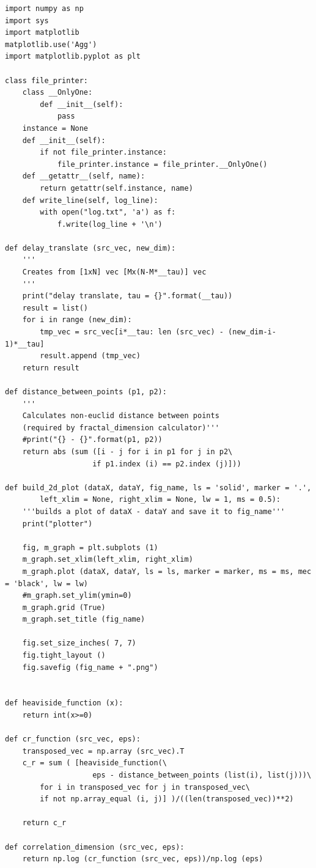 \documentclass[12pt, oneside, a4paper]{article}
\begin{document}
\begin{verbatim}
import numpy as np
import sys
import matplotlib
matplotlib.use('Agg')
import matplotlib.pyplot as plt

class file_printer:
    class __OnlyOne:
        def __init__(self):
            pass
    instance = None
    def __init__(self):
        if not file_printer.instance:
            file_printer.instance = file_printer.__OnlyOne()
    def __getattr__(self, name):
        return getattr(self.instance, name)
    def write_line(self, log_line):
        with open("log.txt", 'a') as f:
            f.write(log_line + '\n')

def delay_translate (src_vec, new_dim):
    '''
    Creates from [1xN] vec [Mx(N-M*__tau)] vec
    '''
    print("delay translate, tau = {}".format(__tau))
    result = list()
    for i in range (new_dim):
        tmp_vec = src_vec[i*__tau: len (src_vec) - (new_dim-i-1)*__tau]
        result.append (tmp_vec)
    return result

def distance_between_points (p1, p2):
    '''
    Calculates non-euclid distance between points
    (required by fractal_dimension calculator)'''
    #print("{} - {}".format(p1, p2))
    return abs (sum ([i - j for i in p1 for j in p2\
                    if p1.index (i) == p2.index (j)]))

def build_2d_plot (dataX, dataY, fig_name, ls = 'solid', marker = '.',
        left_xlim = None, right_xlim = None, lw = 1, ms = 0.5):
    '''builds a plot of dataX - dataY and save it to fig_name'''
    print("plotter")

    fig, m_graph = plt.subplots (1)
    m_graph.set_xlim(left_xlim, right_xlim)
    m_graph.plot (dataX, dataY, ls = ls, marker = marker, ms = ms, mec = 'black', lw = lw)
    #m_graph.set_ylim(ymin=0)
    m_graph.grid (True)
    m_graph.set_title (fig_name)

    fig.set_size_inches( 7, 7)
    fig.tight_layout ()
    fig.savefig (fig_name + ".png")


def heaviside_function (x):
    return int(x>=0)

def cr_function (src_vec, eps):
    transposed_vec = np.array (src_vec).T
    c_r = sum ( [heaviside_function(\
                    eps - distance_between_points (list(i), list(j)))\
        for i in transposed_vec for j in transposed_vec\
        if not np.array_equal (i, j)] )/((len(transposed_vec))**2)

    return c_r

def correlation_dimension (src_vec, eps):
    return np.log (cr_function (src_vec, eps))/np.log (eps)


\end{verbatim}
\end{document}
